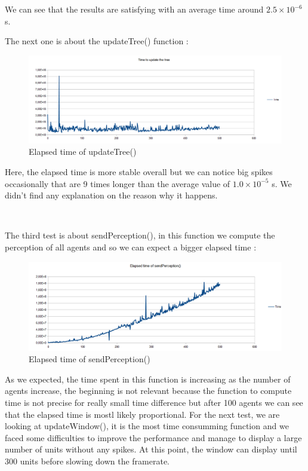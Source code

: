 \documentclass[a4paper,10pt]{book}
\begin{document}
We can see that the results are satisfying with an average time around $2.5\times10^{-6}$ s.

\newpage

The next one is about the updateTree() function :

\begin{figure}[ht]
 \includegraphics[scale=0.5]{updateTree}
 \caption{Elapsed time of updateTree()}
\end{figure}

Here, the elapsed time is more stable overall but we can notice big spikes occasionally that are 9 times longer than the average value of $1.0\times10^{-5}$ s. We didn't find any explanation on the reason why it happens.

~

The third test is about sendPerception(), in this function we compute the perception of all agents and so we can expect a bigger elapsed time :

\begin{figure}[ht]
 \includegraphics[scale=0.5]{sendPerception}
 \caption{Elapsed time of sendPerception()}
\end{figure}

As we expected, the time spent in this function is increasing as the number of agents increase, the beginning is not relevant because the function to compute time is not precise for really small time difference but after 100 agents we can see that the elapsed time is mostl likely proportional.
\newpage
For the next test, we are looking at updateWindow(), it is the most time consumming function and we faced some difficulties to improve the performance and manage to display a large number of units without any spikes. At this point, the window can display until 300 units before slowing down the framerate.
\end{document}
